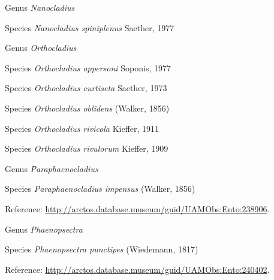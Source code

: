 \documentclass[9pt, article]{memoir}
\begin{document}
\begin{multicols}{2}
\vspace{6pt}\noindent\hspace{30pt}Genus \textit{Nanocladius}


\vspace{6pt}\noindent\hspace{36pt}Species \textit{Nanocladius spiniplenus} Saether, 1977


\vspace{6pt}\noindent\hspace{30pt}Genus \textit{Orthocladius}


\vspace{6pt}\noindent\hspace{36pt}Species \textit{Orthocladius appersoni} Soponis, 1977


\vspace{6pt}\noindent\hspace{36pt}Species \textit{Orthocladius curtiseta} Saether, 1973


\vspace{6pt}\noindent\hspace{36pt}Species \textit{Orthocladius oblidens} (Walker, 1856)


\vspace{6pt}\noindent\hspace{36pt}Species \textit{Orthocladius rivicola} Kieffer, 1911


\vspace{6pt}\noindent\hspace{36pt}Species \textit{Orthocladius rivulorum} Kieffer, 1909


\vspace{6pt}\noindent\hspace{30pt}Genus \textit{Paraphaenocladius}


\vspace{6pt}\noindent\hspace{36pt}Species \textit{Paraphaenocladius impensus} (Walker, 1856)


\vspace{6pt}Reference: 
\url{http://arctos.database.museum/guid/UAMObs:Ento:238906}.

\vspace{6pt}\noindent\hspace{30pt}Genus \textit{Phaenopsectra}


\vspace{6pt}\noindent\hspace{36pt}Species \textit{Phaenopsectra punctipes} (Wiedemann, 1817)


\vspace{6pt}Reference: 
\url{http://arctos.database.museum/guid/UAMObs:Ento:240402}.


\end{multicols}
\end{document}
